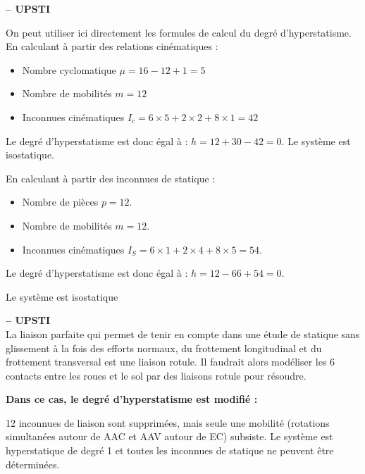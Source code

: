 \ifprof
\begin{corrige}\textbf{ -- UPSTI}\\ 
\vspace{-1cm}
\begin{multicols}{2}
On peut utiliser ici directement les formules de calcul du degré d’hyperstatisme.
En calculant à partir des relations cinématiques :
\begin{itemize}
\item Nombre cyclomatique $\mu =16-12+1=5$
\item Nombre de mobilités $m=12$
\item Inconnues cinématiques $I_c=6\times 5+2\times 2+8\times 1=42$
\end{itemize}
Le degré d’hyperstatisme est donc égal à : $h=12+30-42=0$.
Le système est isostatique.

En calculant à partir des inconnues de statique :
\begin{itemize}
\item Nombre de pièces  $p=12$.
\item Nombre de mobilités $m=12$.
\item Inconnues cinématiques $I_S=6\times 1+2\times 4+8\times 5=54$.
\end{itemize}
Le degré d’hyperstatisme est donc égal à : $h=12-66+54=0$.

Le système est isostatique

\end{multicols}
\end{corrige}
\else
\fi

\ifprof
\begin{corrige}\textbf{ -- UPSTI}\\ 
La liaison parfaite qui permet de tenir en compte dans une étude de statique sans glissement  à la fois des efforts normaux, du frottement longitudinal et du frottement transversal est une liaison rotule. Il faudrait alors modéliser les 6 contacts entre les roues et le sol par des liaisons rotule pour résoudre.


\textbf{Dans ce cas, le degré d’hyperstatisme est modifié :}

12 inconnues de liaison sont supprimées, mais seule une mobilité (rotations simultanées autour de AAC et AAV autour de EC) subsiste. Le système est hyperstatique de degré 1 et toutes les inconnues de statique ne peuvent être déterminées. 

\end{corrige}
\else
\fi


